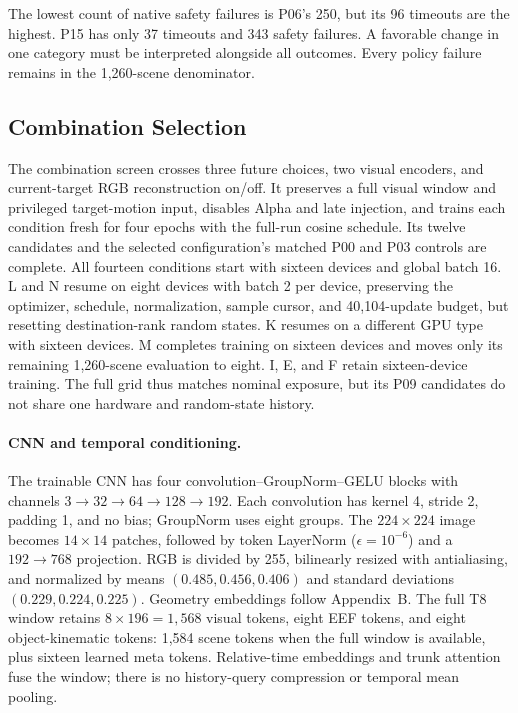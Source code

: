 The lowest count of native safety failures is P06's 250, but its 96
timeouts are the highest. P15 has only 37 timeouts and 343 safety failures.
A favorable change in one category must be interpreted alongside all
outcomes. Every policy failure remains in the 1,260-scene denominator.

\subsection{Combination Selection}
The combination screen crosses three future choices, two visual encoders, and
current-target RGB reconstruction on/off. It preserves a full visual
window and privileged target-motion input, disables Alpha and late
injection, and trains each condition fresh for four epochs with the
full-run cosine schedule. Its twelve candidates and the selected configuration's
matched P00 and P03 controls are complete.
All fourteen conditions start with sixteen devices and global batch 16.
L and N resume on eight devices with batch 2 per device, preserving the
optimizer, schedule, normalization, sample cursor, and 40,104-update budget,
but resetting destination-rank random states. K resumes on a different GPU
type with sixteen devices. M completes training on sixteen devices and moves
only its remaining 1,260-scene evaluation to eight. I, E, and F retain
sixteen-device training. The full grid thus matches nominal exposure,
but its P09 candidates do not share one hardware and random-state history.



\paragraph{CNN and temporal conditioning.}
The trainable CNN has four convolution--GroupNorm--GELU blocks with
channels $3\to32\to64\to128\to192$. Each convolution has kernel 4,
stride 2, padding 1, and no bias; GroupNorm uses eight groups.
The $224\times224$ image becomes $14\times14$ patches, followed by
token LayerNorm ($\epsilon=10^{-6}$) and a $192\to768$ projection.
RGB is divided by 255, bilinearly resized with antialiasing, and
normalized by means $(0.485,0.456,0.406)$ and standard deviations
$(0.229,0.224,0.225)$. Geometry embeddings follow Appendix~B.
The full T8 window retains $8\times196=1,568$ visual tokens, eight
EEF tokens, and eight object-kinematic tokens: 1,584 scene tokens
when the full window is available, plus sixteen learned meta tokens.
Relative-time embeddings and trunk attention fuse the window;
there is no history-query compression or temporal mean pooling.

